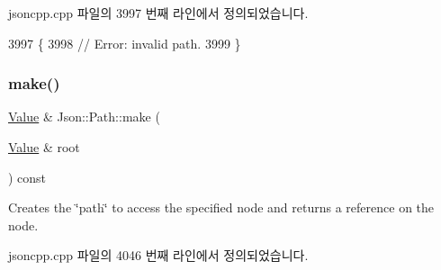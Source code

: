 jsoncpp.\+cpp 파일의 3997 번째 라인에서 정의되었습니다.


\begin{DoxyCode}
3997                                                      \{
3998   \textcolor{comment}{// Error: invalid path.}
3999 \}
\end{DoxyCode}
\mbox{\label{class_json_1_1_path_a858f9426f0f7bbe0450644d72b44e26b}} 
\subsubsection{\texorpdfstring{make()}{make()}}
{\footnotesize\ttfamily \hyperlink{class_json_1_1_value}{Value} \& Json\+::\+Path\+::make (\begin{DoxyParamCaption}\item[{\hyperlink{class_json_1_1_value}{Value} \&}]{root }\end{DoxyParamCaption}) const}

Creates the \char`\"{}path\char`\"{} to access the specified node and returns a reference on the node. 

jsoncpp.\+cpp 파일의 4046 번째 라인에서 정의되었습니다.



